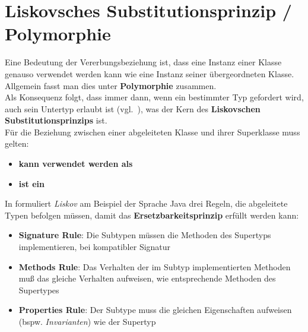 \section{Liskovsches Substitutionsprinzip / Polymorphie}

\begin{tcolorbox}[title=Liskovsches Substitutionsprinzip / Polymorphie]
Eine Bedeutung der Vererbungsbeziehung ist, dass eine Instanz einer Klasse genauso verwendet werden kann wie eine Instanz seiner übergeordneten Klasse.\\
Allgemein fasst man dies unter \textbf{Polymorphie} zusammen.\\
Als Konsequenz folgt, dass immer dann, wenn ein bestimmter Typ gefordert wird, auch sein Untertyp erlaubt ist (vgl.~\cite[466]{Ull23}), was der Kern des \textbf{Liskovschen Substitutionsprinzips} ist.\\

\noindent
Für die Beziehung zwischen einer abgeleiteten Klasse und ihrer Superklasse muss gelten:

\begin{itemize}
    \item \textbf{kann verwendet werden als}
    \item \textbf{ist ein}
\end{itemize}

In \cite[174 ff.]{LG00} formuliert \textit{Liskov} am Beispiel der Sprache Java drei Regeln, die abgeleitete Typen befolgen müssen, damit das \textbf{Ersetzbarkeitsprinzip} erfüllt werden kann:
\begin{itemize}
    \item \textbf{Signature Rule}: Die Subtypen müssen die Methoden des Supertyps implementieren, bei kompatibler Signatur
    \item \textbf{Methods Rule}: Das Verhalten der im Subtyp implementierten Methoden muß das gleiche Verhalten aufweisen, wie entsprechende Methoden des Supertypes
    \item \textbf{Properties Rule}: Der Subtype muss die gleichen Eigenschaften aufweisen (bspw. \textit{Invarianten}) wie der Supertyp
\end{itemize}
\end{tcolorbox}
